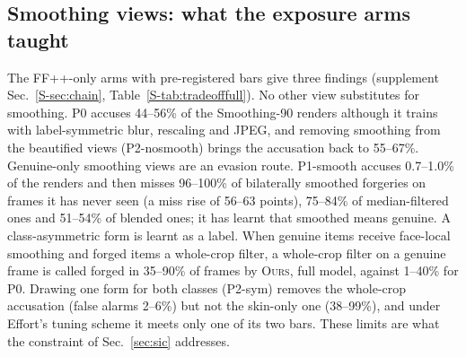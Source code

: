 \documentclass[conference]{IEEEtran}
\newcommand{\oursF}{\textsc{Ours}, full model}
\begin{document}
\subsection{Smoothing views: what the exposure arms taught}
\label{sec:chain}
The FF++-only arms with pre-registered bars give three findings (supplement Sec.~\ref{S-sec:chain},
Table~\ref{S-tab:tradeofffull}). No other view substitutes for smoothing. P0 accuses 44--56\% of the Smoothing-90
renders although it trains with label-symmetric blur, rescaling and JPEG, and removing smoothing from the beautified views
(P2-nosmooth) brings the accusation back to 55--67\%. Genuine-only smoothing views are an evasion route. P1-smooth
accuses 0.7--1.0\% of the renders and then misses 96--100\% of bilaterally smoothed forgeries on frames it has never seen
(a miss rise of 56--63 points), 75--84\% of median-filtered ones and 51--54\% of blended ones; it has learnt that smoothed means
genuine. A class-asymmetric form is learnt as a label. When genuine items receive face-local smoothing and forged items
a whole-crop filter, a whole-crop filter on a genuine frame is called forged in 35--90\% of frames by \oursF{}, against
1--40\% for P0. Drawing one form for both classes (P2-sym) removes the whole-crop accusation (false alarms 2--6\%) but not
the skin-only one (38--99\%), and under Effort's tuning scheme it meets only one of its two bars. These limits are what the
constraint of Sec.~\ref{sec:sic} addresses.
\end{document}
